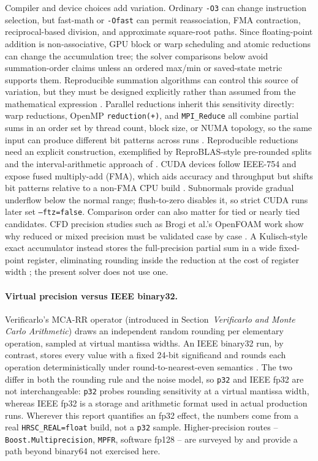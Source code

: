 Compiler and device choices add variation. Ordinary \texttt{-O3} can change
instruction selection, but fast-math or \texttt{-Ofast} can permit
reassociation, FMA contraction, reciprocal-based division, and approximate
square-root paths. Since floating-point addition is non-associative, GPU block
or warp scheduling and atomic reductions can change the accumulation tree; the
solver comparisons below avoid summation-order claims unless an ordered max/min
or saved-state metric supports them. Reproducible summation algorithms can
control this source of variation, but they must be designed explicitly rather
than assumed from the mathematical expression \citep{demmel_nguyen_2013}.
Parallel reductions inherit this sensitivity directly: warp reductions, OpenMP
\texttt{reduction(+)}, and \texttt{MPI\_Reduce} all combine partial sums in an
order set by thread count, block size, or NUMA topology, so the same input can
produce different bit patterns across runs \citep{collange_etal_2015}.
Reproducible reductions need an explicit construction, exemplified by
ReproBLAS-style pre-rounded splits \citep{demmel_nguyen_2013} and the
interval-arithmetic approach of \citet{revol_theveny_2014}. CUDA
devices follow IEEE-754 and expose fused multiply-add (FMA), which aids
accuracy and throughput but shifts bit patterns relative to a non-FMA CPU
build \citep{whitehead_fitflorea_2011}. Subnormals provide gradual underflow
below the normal range; flush-to-zero disables it, so strict CUDA runs later
set \texttt{--ftz=false}. Comparison order can also matter for tied
or nearly tied candidates. CFD precision studies such as Brogi et al.'s
OpenFOAM work show why reduced or mixed precision must be validated case by
case \citep{brogi_etal_2024}. A
Kulisch-style exact accumulator instead stores the full-precision partial sum in
a wide fixed-point register, eliminating rounding inside the reduction at the
cost of register width \citep{kulisch_2013}; the present solver does not use one.

\paragraph{Virtual precision versus IEEE binary32.}
Verificarlo's MCA-RR operator (introduced in
Section~\emph{Verificarlo and Monte Carlo Arithmetic}) draws an independent
random rounding per elementary operation, sampled at virtual mantissa widths.
An IEEE binary32 run, by contrast, stores every value with a
fixed 24-bit significand and rounds each operation deterministically under
round-to-nearest-even semantics \citep{ieee754_2019}. The two differ in
both the rounding rule and the noise model, so \texttt{p32} and IEEE fp32
are not interchangeable: \texttt{p32} probes rounding sensitivity at a
virtual mantissa width, whereas IEEE fp32 is a storage and arithmetic
format used in actual production runs. Wherever this report quantifies an
fp32 effect, the numbers come from a real \texttt{HRSC\_REAL=float} build,
not a \texttt{p32} sample. Higher-precision routes --
\texttt{Boost.Multiprecision}, \texttt{MPFR}, software fp128 -- are surveyed by
\citet{bailey_borwein_borwein_2015} and provide a path beyond binary64 not
exercised here.

